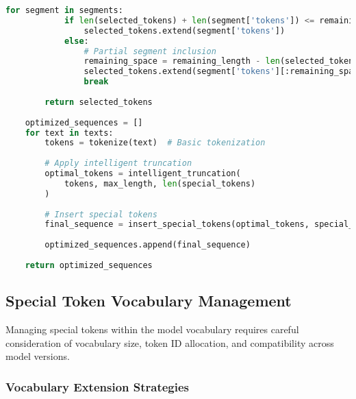 \begin{lstlisting}[language=Python, caption=Length-aware special token positioning]
        for segment in segments:
            if len(selected_tokens) + len(segment['tokens']) <= remaining_length:
                selected_tokens.extend(segment['tokens'])
            else:
                # Partial segment inclusion
                remaining_space = remaining_length - len(selected_tokens)
                selected_tokens.extend(segment['tokens'][:remaining_space])
                break
        
        return selected_tokens
    
    optimized_sequences = []
    for text in texts:
        tokens = tokenize(text)  # Basic tokenization
        
        # Apply intelligent truncation
        optimal_tokens = intelligent_truncation(
            tokens, max_length, len(special_tokens)
        )
        
        # Insert special tokens
        final_sequence = insert_special_tokens(optimal_tokens, special_tokens)
        
        optimized_sequences.append(final_sequence)
    
    return optimized_sequences
\end{lstlisting}

\subsection{Special Token Vocabulary Management}

Managing special tokens within the model vocabulary requires careful consideration of vocabulary size, token ID allocation, and compatibility across model versions.

\subsubsection{Vocabulary Extension Strategies}

